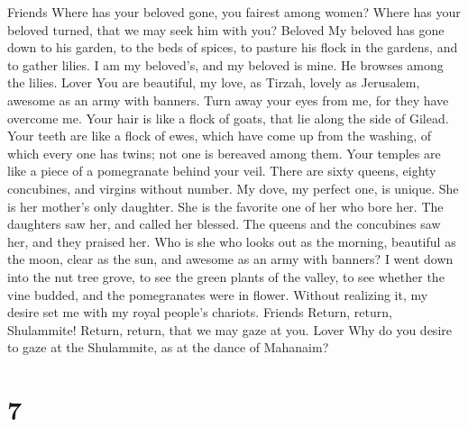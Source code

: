 Friends  Where has your beloved gone, you fairest among
women? Where has your beloved turned, that we may seek him with you?
Beloved  My beloved has gone down to his garden, to the beds
of spices, to pasture his flock in the gardens, and to gather lilies.
 I am my beloved's, and my beloved is mine. He browses among
the lilies. Lover  You are beautiful, my love, as Tirzah,
lovely as Jerusalem, awesome as an army with banners.  Turn
away your eyes from me, for they have overcome me. Your hair is like a
flock of goats, that lie along the side of Gilead.  Your
teeth are like a flock of ewes, which have come up from the washing, of
which every one has twins; not one is bereaved among them. 
Your temples are like a piece of a pomegranate behind your veil.
 There are sixty queens, eighty concubines, and virgins
without number.  My dove, my perfect one, is unique. She is
her mother's only daughter. She is the favorite one of her who bore her.
The daughters saw her, and called her blessed. The queens and the
concubines saw her, and they praised her.  Who is she who
looks out as the morning, beautiful as the moon, clear as the sun, and
awesome as an army with banners?  I went down into the nut
tree grove, to see the green plants of the valley, to see whether the
vine budded, and the pomegranates were in flower.  Without
realizing it, my desire set me with my royal people's chariots. Friends
 Return, return, Shulammite! Return, return, that we may
gaze at you. Lover Why do you desire to gaze at the Shulammite, as at
the dance of Mahanaim?

\hypertarget{section-6}{%
\section{7}\label{section-6}}

